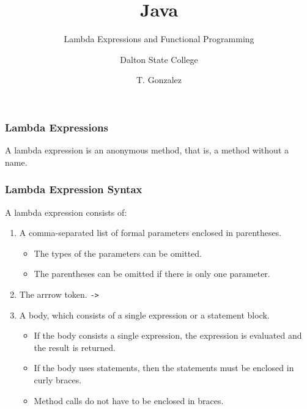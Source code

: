 \documentclass{beamer}
\title[Lambda Expressions and Functional Programming]{Java}
\subtitle{Lambda Expressions and Functional Programming} %
\author[]{Dalton State College}
\date[T. Gonzalez]{T. Gonzalez}
\newcommand{\mil}[1]{\texttt{#1}}
\begin{document}
\begin{frame}

	\titlepage
	
\end{frame}

\begin{frame}

    \frametitle{Lambda Expressions}
    
    A lambda expression is an anonymous method, that is, a method without a name.
    
\end{frame}

\begin{frame}[fragile]
    
    \frametitle{Lambda Expression Syntax}
    
        A lambda expression consists of:
        
        \begin{enumerate}
        
            \item A comma-separated list of formal parameters enclosed in parentheses.
                \begin{itemize}
                    \item The types of the parameters can be omitted.
                    \item The parentheses can be omitted if there is only one parameter.
                \end{itemize}
            \bigskip    
            \item The arrrow token. \mil{->}
            \bigskip            
            \item A body, which consists of a single expression or a statement block.
                \begin{itemize}
                    \item If the body consists a single expression, the expression is evaluated and the result is returned.
                    \item If the body uses statements, then the statements must be enclosed in curly braces.
                    \item Method calls do not have to be enclosed in braces.
                \end{itemize}
            
        \end{enumerate} 
\end{frame}
\end{document}

